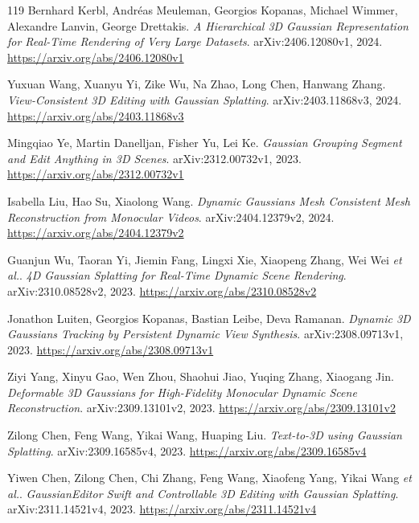 \documentclass[11pt,a4paper]{article}
\begin{document}
\begin{thebibliography}{119}
Bernhard Kerbl, Andr\'{e}as Meuleman, Georgios Kopanas, Michael Wimmer, Alexandre Lanvin, George Drettakis.
\newblock \emph{A Hierarchical 3D Gaussian Representation for Real-Time Rendering of Very Large Datasets}.
\newblock arXiv:2406.12080v1, 2024.
\newblock \url{https://arxiv.org/abs/2406.12080v1}

Yuxuan Wang, Xuanyu Yi, Zike Wu, Na Zhao, Long Chen, Hanwang Zhang.
\newblock \emph{View-Consistent 3D Editing with Gaussian Splatting}.
\newblock arXiv:2403.11868v3, 2024.
\newblock \url{https://arxiv.org/abs/2403.11868v3}

Mingqiao Ye, Martin Danelljan, Fisher Yu, Lei Ke.
\newblock \emph{Gaussian Grouping Segment and Edit Anything in 3D Scenes}.
\newblock arXiv:2312.00732v1, 2023.
\newblock \url{https://arxiv.org/abs/2312.00732v1}

Isabella Liu, Hao Su, Xiaolong Wang.
\newblock \emph{Dynamic Gaussians Mesh Consistent Mesh Reconstruction from Monocular Videos}.
\newblock arXiv:2404.12379v2, 2024.
\newblock \url{https://arxiv.org/abs/2404.12379v2}

Guanjun Wu, Taoran Yi, Jiemin Fang, Lingxi Xie, Xiaopeng Zhang, Wei Wei \emph{et al.}.
\newblock \emph{4D Gaussian Splatting for Real-Time Dynamic Scene Rendering}.
\newblock arXiv:2310.08528v2, 2023.
\newblock \url{https://arxiv.org/abs/2310.08528v2}

Jonathon Luiten, Georgios Kopanas, Bastian Leibe, Deva Ramanan.
\newblock \emph{Dynamic 3D Gaussians Tracking by Persistent Dynamic View Synthesis}.
\newblock arXiv:2308.09713v1, 2023.
\newblock \url{https://arxiv.org/abs/2308.09713v1}

Ziyi Yang, Xinyu Gao, Wen Zhou, Shaohui Jiao, Yuqing Zhang, Xiaogang Jin.
\newblock \emph{Deformable 3D Gaussians for High-Fidelity Monocular Dynamic Scene Reconstruction}.
\newblock arXiv:2309.13101v2, 2023.
\newblock \url{https://arxiv.org/abs/2309.13101v2}

Zilong Chen, Feng Wang, Yikai Wang, Huaping Liu.
\newblock \emph{Text-to-3D using Gaussian Splatting}.
\newblock arXiv:2309.16585v4, 2023.
\newblock \url{https://arxiv.org/abs/2309.16585v4}

Yiwen Chen, Zilong Chen, Chi Zhang, Feng Wang, Xiaofeng Yang, Yikai Wang \emph{et al.}.
\newblock \emph{GaussianEditor Swift and Controllable 3D Editing with Gaussian Splatting}.
\newblock arXiv:2311.14521v4, 2023.
\newblock \url{https://arxiv.org/abs/2311.14521v4}


\end{thebibliography}
\end{document}
